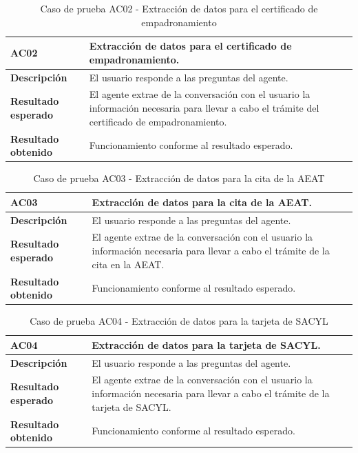     \begin{table}[H]
        \centering
        \begin{tabular}{|l|p{12cm}|}
        \hline
        \textbf{AC02} & Extracción de datos para el certificado de empadronamiento. \\ \hline
        \textbf{Descripción} & El usuario responde a las preguntas del agente.  \\ \hline
        \textbf{Resultado esperado} & El agente extrae de la conversación con el usuario la información necesaria para llevar a cabo el trámite del certificado de empadronamiento. \\ \hline
        \textbf{Resultado obtenido} & Funcionamiento conforme al resultado esperado. \\ \hline
        \end{tabular}
        \caption{Caso de prueba AC02 - Extracción de datos para el certificado de empadronamiento}
        \label{tab:6.27}
    \end{table}

    \begin{table}[H]
        \centering
        \begin{tabular}{|l|p{12cm}|}
        \hline
        \textbf{AC03} & Extracción de datos para la cita de la AEAT. \\ \hline
        \textbf{Descripción} & El usuario responde a las preguntas del agente. \\ \hline
        \textbf{Resultado esperado} & El agente extrae de la conversación con el usuario la información necesaria para llevar a cabo el trámite de la cita en la AEAT. \\ \hline
        \textbf{Resultado obtenido} & Funcionamiento conforme al resultado esperado. \\ \hline
        \end{tabular}
        \caption{Caso de prueba AC03 - Extracción de datos para la cita de la AEAT}
        \label{tab:6.28}
    \end{table}

    \begin{table}[H]
        \centering
        \begin{tabular}{|l|p{12cm}|}
        \hline
        \textbf{AC04} & Extracción de datos para la tarjeta de SACYL. \\ \hline
        \textbf{Descripción} & El usuario responde a las preguntas del agente. \\ \hline
        \textbf{Resultado esperado} & El agente extrae de la conversación con el usuario la información necesaria para llevar a cabo el trámite de la tarjeta de SACYL. \\ \hline
        \textbf{Resultado obtenido} & Funcionamiento conforme al resultado esperado. \\ \hline
        \end{tabular}
        \caption{Caso de prueba AC04 - Extracción de datos para la tarjeta de SACYL}
        \label{tab:6.29}
    \end{table}

